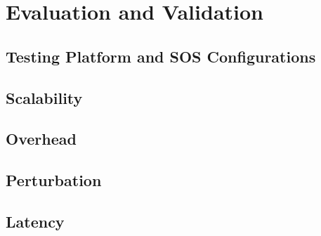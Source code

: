 
\section{Evaluation and Validation}
\subsection{Testing Platform and SOS Configurations}
\subsection{Scalability}
\subsection{Overhead}
\subsection{Perturbation}
\subsection{Latency}
